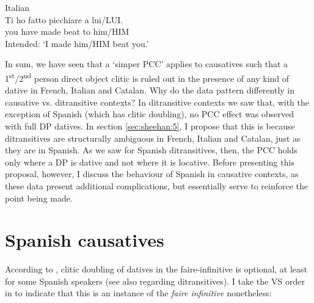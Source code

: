 \documentclass[output=paper,colorlinks,citecolor=brown,nonflat]{./langscibook}
\begin{document}
\ea%
    \label{ex:sheehan:28}
    Italian\footnotemark{}\\
    \gll    *Ti ho        fatto   picchiare   a    lui/LUI.\\
            you have   made   beat     to him/HIM\\
    \glt    Intended: ‘I made him/HIM beat you.’
\z
{}

In sum, we have seen that a ‘simper PCC’ applies to causatives such that a 1\textsuperscript{st}/2\textsuperscript{nd} person direct object clitic is ruled out in the presence of any kind of dative in French, Italian and Catalan. Why do the data pattern differently in causative vs. ditransitive contexts? In ditransitive contexts we saw that, with the exception of Spanish (which has clitic doubling), no PCC effect was observed with full DP datives. In section \ref{sec:sheehan:5}, I propose that this is because ditransitives are structurally ambiguous in French, Italian and Catalan, just as they are in Spanish. As we saw for Spanish ditransitives, then, the PCC holds only where a DP is dative and not where it is locative. Before presenting this proposal, however, I discuss the behaviour of Spanish in causative contexts, as these data present additional complications, but essentially serve to reinforce the point being made. 

\section{Spanish causatives}\label{sec:sheehan:4}

According to \citet{Torrego2010}, clitic doubling of datives in the faire-infinitive is optional, at least for some Spanish speakers (see also \citealt{Pineda2013} regarding ditransitives). I take the VS order in  to indicate that this is an instance of the \textit{faire infinitive} nonetheless:
\end{document}
